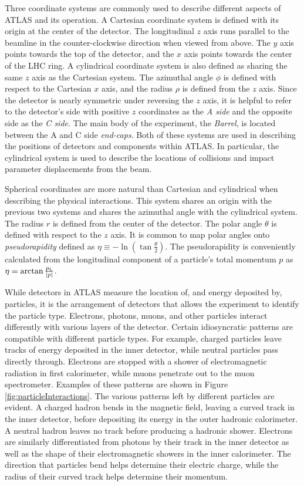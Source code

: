 Three coordinate systems are commonly used to describe different aspects of ATLAS and its operation.
A Cartesian coordinate system is defined with its origin at the center of the detector.
The longitudinal $z$ axis runs parallel to the beamline in the counter-clockwise direction when viewed from above.
The $y$ axis points towards the top of the detector, and the $x$ axis points towards the center of the LHC ring.
A cylindrical coordinate system is also defined as sharing the same $z$ axis as the Cartesian system.
The azimuthal angle $\phi$ is defined with respect to the Cartesian $x$ axis, and the radius $\rho$ is defined from the $z$ axis.
Since the detector is nearly symmetric under reversing the $z$ axis, it is helpful to refer to the detector's side with positive $z$ coordinates as the \emph{A side} and the opposite side as the \emph{C side}.
The main body of the experiment, the \emph{Barrel}, is located between the A and C side \emph{end-caps}.
Both of these systems are used in describing the positions of detectors and components within ATLAS.
In particular, the cylindrical system is used to describe the locations of collisions and impact parameter displacements from the beam.

Spherical coordinates are more natural than Cartesian and cylindrical when describing the physical interactions.
This system shares an origin with the previous two systems and shares the azimuthal angle with the cylindrical system.
The radius $r$ is defined from the center of the detector.
The polar angle $\theta$ is defined with respect to the $z$ axis.
It is common to map polar angles onto \emph{pseudorapidity} defined as $\eta\equiv-\ln(\tan\frac{\theta}{2})$.
The pseudorapidity is conveniently calculated from the longitudinal component \plong of a particle's total momentum $p$ as $\eta=\arctan{\frac{\ensuremath{p_\text{L}}}{|p|}}$.

While detectors in ATLAS measure the location of, and energy deposited by, particles, it is the arrangement of detectors that allows the experiment to identify the particle type.
Electrons, photons, muons, and other particles interact differently with various layers of the detector.
Certain idiosyncratic patterns are compatible with different particle types.
For example, charged particles leave tracks of energy deposited in the inner detector, while neutral particles pass directly through.
Electrons are stopped with a shower of electromagnetic radiation in first calorimeter, while muons penetrate out to the muon spectrometer.
Examples of these patterns are shown in Figure \ref{fig:particleInteractions}.
The various patterns left by different particles are evident.
A charged hadron bends in the magnetic field, leaving a curved track in the inner detector, before depositing its energy in the outer hadronic calorimeter.
A neutral hadron leaves no track before producing a hadronic shower.
Electrons are similarly differentiated from photons by their track in the inner detector as well as the shape of their electromagnetic showers in the inner calorimeter.
The direction that particles bend helps determine their electric charge, while the radius of their curved track helps determine their momentum.


